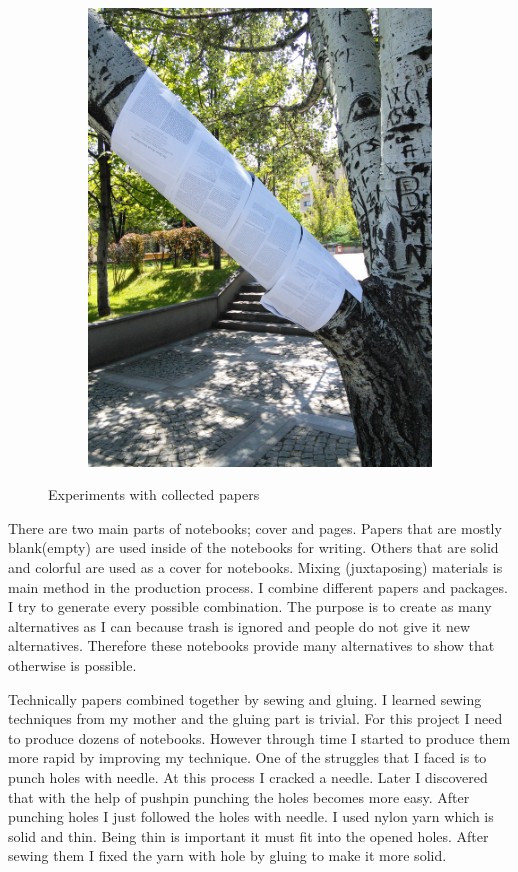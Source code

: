 \begin{figure}
\begin{subfigure}[b]{0.48\textwidth}
        \includegraphics[width=\textwidth]{project_graphics/tree_experiment2.jpg}
    \end{subfigure}
    \caption{Experiments with collected papers}
    \label{fig:ExperimentWithPaper}
\end{figure}

There are two main parts of notebooks; cover and pages. Papers that are mostly blank(empty) are used inside of the notebooks for writing. Others that are solid and colorful are used as a cover for notebooks. Mixing (juxtaposing) materials is main method in the production process. I combine different papers and packages. I try to generate every possible combination. The purpose is to create as many alternatives as I can because trash is ignored and people do not give it new alternatives. Therefore these notebooks provide many alternatives to show that otherwise is possible. 

Technically papers combined together by sewing and gluing. I learned sewing techniques from my mother and the gluing part is trivial. For this project I need to produce dozens of notebooks. However through time I started to produce them more rapid by improving my technique. One of the struggles that I faced is to punch holes with needle. At this process I cracked a needle. Later I discovered that with the help of pushpin punching the holes becomes more easy. After punching holes I just followed the holes with needle. I used nylon yarn which is solid and thin. Being thin is important it must fit into the opened holes. After sewing them I fixed the yarn with hole by gluing to make it more solid.

